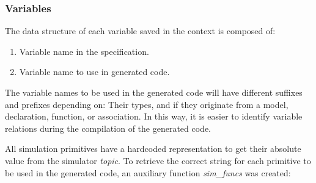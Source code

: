 \subsubsection{Variables}
\label{sssec:compileVars}

The data structure of each variable saved in the context is composed of:

\begin{enumerate}
    \item Variable name in the specification.
    \item Variable name to use in generated code.
\end{enumerate}

The variable names to be used in the generated code will have different suffixes and prefixes depending on: Their types, and if they originate from a model, declaration, function, or association. In this way, it is easier to identify variable relations during the compilation of the generated code.

All simulation primitives have a hardcoded representation to get their absolute value from the simulator \textit{topic}. To retrieve the correct string for each primitive to be used in the generated code, an auxiliary function \textit{sim\_funcs} was created:

